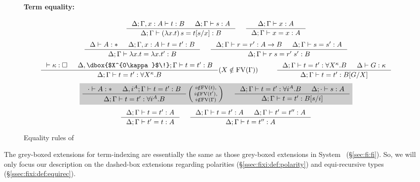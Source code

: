 \begin{figure}
\begin{singlespace}
\paragraph{Term equality:} 
\[
   \inference{\Delta;\Gamma,x:A |- t:B & \Delta;\Gamma |- s:A}{
              \Delta;\Gamma |- (\lambda x.t)\,s=t[s/x] : B}
 ~~~~
   \inference{\Delta;\Gamma |- x:A}{\Delta;\Gamma |- x=x:A}
\]
\[ \inference{\Delta |- A:* & \Delta;\Gamma,x:A |- t=t':B}{
              \Delta;\Gamma |- \lambda x.t = \lambda x.t':B}
 ~~~~
   \inference{\Delta;\Gamma |- r=r':A-> B & \Delta;\Gamma |- s=s':A}{
              \Delta;\Gamma |- r\;s=r'\;s':B}
\]
\[ \inference{ |- \kappa:\square
	     & \Delta, \dbox{$X^{0\kappa}$\!};\Gamma |- t=t' : B}{
              \Delta;\Gamma |- t=t' : \forall X^\kappa.B}
	     (X\notin\FV(\Gamma))
 ~~~~ ~~~~
   \inference{ \Delta;\Gamma |- t=t' : \forall X^\kappa.B
             & \Delta |- G:\kappa }{
              \Delta;\Gamma |- t=t' : B[G/X]}
\]
\[ \newFi{
   \inference{\cdot |- A:* & \Delta, i^A;\Gamma |- t=t' : B}{
              \Delta;\Gamma |- t=t' : \forall i^A.B}
   \left(\begin{smallmatrix}
		i\notin\FV(t),\\
		i\notin\FV(t'),\\
		i\notin\FV(\Gamma)\end{smallmatrix}\right)
 ~~~~
   \inference{ \Delta;\Gamma |- t=t' : \forall i^A.B
             & \Delta;\cdot |- s:A}{
              \Delta;\Gamma |- t=t' : B[s/i]} }
\]
\[ \inference{\Delta;\Gamma |- t=t':A}{\Delta;\Gamma |- t'=t:A}
 ~~~~
   \inference{\Delta;\Gamma |- t=t':A & \Delta;\Gamma |- t'=t'':A}{
              \Delta;\Gamma |- t=t'':A}
\]
\end{singlespace}
\caption{Equality rules of \Fixi}
\label{fig:eqFixi}
\end{figure}

The grey-boxed extensions for term-indexing are essentially the same as
those grey-boxed extensions in System \Fi\ (\S\ref{sec:fi:fi}). So, we will
only focus our description on the dashed-box extensions regarding polarities
(\S\ref{ssec:fixi:def:polarity}) and equi-recursive types
(\S\ref{ssec:fixi:def:equirec}).


